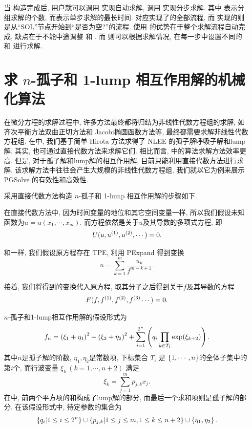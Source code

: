 当  构造完成后, 用户就可以调用  实现自动求解, 调用  实现分步求解. 其中 表示分组求解的个数, 而表示单步求解的最长时间.   对应实现了的全部流程, 而  实现的则是从``SOL''节点开始到``是否为空?''的流程. 使用  的优势在于整个求解流程自动完成, 缺点在于不能中途调整  和 . 而  则可以根据求解情况, 在每一步中设置不同的  和  进行求解. 

\section{求 $n$-孤子和 1-lump 相互作用解的机械化算法}
在微分方程的求解过程中, 许多方法最终都将归结为非线性代数方程组的求解, 如齐次平衡方法\D 双曲正切方法和 Jacobi椭圆函数方法等, 最终都需要求解非线性代数方程组. 在中, 我们基于简单 Hirota 方法求得了 NLEE 的孤子解\D 呼吸子解和lump 解. 其实, 也可通过直接代数方法来求解它们. 相比而言, 中的算法求解方法效率更高. 但是, 对于孤子解和lump解的相互作用解, 目前只能利用直接代数方法进行求解. 该求解方法中往往会产生大规模的非线性代数方程组, 我们就以它为例来展示 PGSolve 的有效性和高效性. 

采用直接代数方法构造 $n$-孤子和 1-lump 相互作用解的步骤如下. 

在直接代数方法中, 因为时间变量的地位和其它空间变量一样, 所以我们假设未知函数为$u=u(x_1,\cdots,x_m)$. 而方程依然是关于$u$及其导数的多项式方程, 即
\begin{equation}
    U(u,u^{(1)},u^{(2)},\cdots)=0 .
\end{equation}

和一样, 我们假设原方程存在 TPE, 利用 PExpand 得到变换
\begin{equation}
    u=\sum_{k=1}^m{\frac{u_k}{f^{m-k+1}}} .
\end{equation}

接着, 我们将得到的变换代入原方程, 取其分子之后得到关于$f$及其导数的方程
\begin{equation}
    F(f,f^{(1)},f^{(2)},f^{(3)}\cdots)=0 .
\end{equation}

$n$-孤子和1-lump相互作用解的假设形式为  
\begin{equation}
f_n=\left(\xi_1+\eta_1\right)^2+\left(\xi_2+\eta_2\right)^2+\sum_{i=1}^{2^n}\left(q_i\prod_{k \in T_i}{\exp(\xi_{k+2})}\right). \label{f-ns1l}
\end{equation}
其中$n$是孤子解的阶数, $\eta_1,\eta_2$是常数项, 下标集合 $T_i$ 是 $\left\{1,\cdots,n\right\}$的全体子集中的第$i$个, 而行波变量 $\xi_k~(k=1,\cdots,n+2)$ 满足
\begin{equation}
\xi_k=\sum_{j=1}^m{p_{j,k}x_j}.
\end{equation}
在中, 前两个平方项的和构成了lump解的部分, 而最后一个求和项则是孤子解的部分. 在该假设形式中, 待定参数的集合为
\begin{equation}
    \left\{q_i|1\le i \le 2^n\right\} \cup \left\{p_{j,k}|1\le j \le m, 1\le k \le n+2\right\} \cup \left\{\eta_1,\eta_2\right\}. 
\end{equation}

